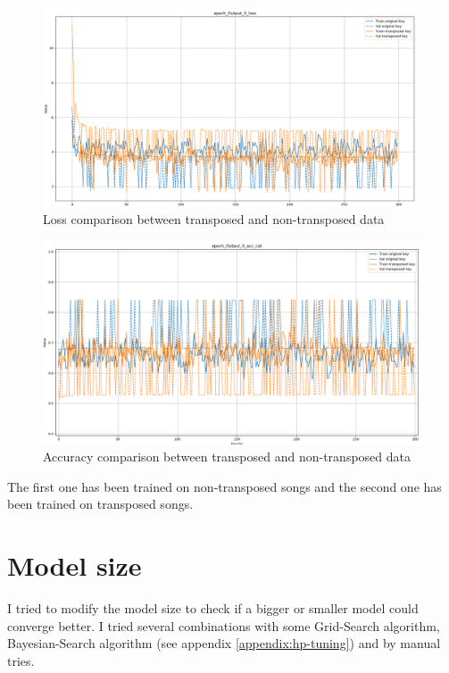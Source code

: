 \documentclass[12pt]{report}
\begin{document}
\begin{figure}[htbp]
    \centering
    \includegraphics[width=\textwidth]{images/experiences/transpose/loss-comparison-transpose.png}
    \caption{Loss comparison between transposed and non-transposed data}
    \label{fig:loss-comparison-transposed}
\end{figure}
\begin{figure}[htbp]
    \centering
    \includegraphics[width=\textwidth]{images/experiences/transpose/acc-comparison-transpose.png}
    \caption{Accuracy comparison between transposed and non-transposed data}
    \label{fig:acc-comparison-transposed}
\end{figure}

The first one has been trained on non-transposed songs and the second one has been trained on transposed songs.

\section{Model size}
\label{sec:exp:size}

I tried to modify the model size to check if a bigger or smaller model could converge better.
I tried several combinations with some Grid-Search algorithm, Bayesian-Search algorithm (see appendix \ref{appendix:hp-tuning}) and by manual tries.
\end{document}
